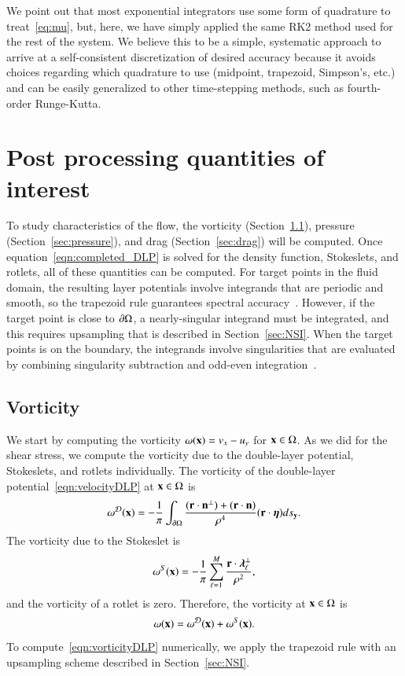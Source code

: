 \documentclass[preprint, 10pt]{elsarticle}
\begin{document}
We point out that most exponential integrators use some form of quadrature to treat~\eqref{eq:mu}, but, here, we have simply applied the same RK2 method used for the rest of the system. We believe this to be a simple, systematic approach to arrive at a self-consistent discretization of desired accuracy because it avoids choices regarding which quadrature to use (midpoint, trapezoid, Simpson's, etc.) and can be easily generalized to other time-stepping methods, such as fourth-order Runge-Kutta. 


\section{Post processing quantities of interest}
\label{s:qoi}
To study characteristics of the flow, the vorticity
(Section~\ref{sec:vorticity}), pressure (Section~\ref{sec:pressure}),
and drag (Section~\ref{sec:drag}) will be computed.  Once
equation~\eqref{eqn:completed_DLP} is solved for the density function,
Stokeslets, and rotlets, all of these quantities can be computed.  For
target points in the fluid domain, the resulting layer potentials
involve integrands that are periodic and smooth, so the trapezoid rule
guarantees spectral accuracy~\cite{tre-wei2014}.  However, if the target
point is close to ${\partial} \Omega$, a nearly-singular integrand must be
integrated, and this requires upsampling that is described in
Section~\ref{sec:NSI}.  When the target points is on the boundary, the
integrands involve singularities that are evaluated by combining
singularity subtraction and odd-even integration~\cite{sid-isr1988}.  



\subsection{Vorticity}
\label{sec:vorticity}
We start by computing the vorticity $\omega({\mathbf{x}}) = v_x - u_y$ for ${\mathbf{x}} \in
\Omega$.  As we did for the shear stress, we compute the vorticity due
to the double-layer potential, Stokeslets, and rotlets individually.
The vorticity of the double-layer potential~\eqref{eqn:velocityDLP} at
${\mathbf{x}} \in \Omega$ is
\begin{align}
  \omega^{{\mathcal{D}}}({\mathbf{x}}) = -\frac{1}{\pi}\int_{{\partial}\Omega} 
    \frac{({\mathbf{r}} \cdot {\mathbf{n}}^\perp) + ({\mathbf{r}} \cdot {\mathbf{n}})}{\rho^4}
    ({\mathbf{r}} \cdot {\boldsymbol\eta}) ds_{{\mathbf{y}}}.
  \label{eqn:vorticityDLP}
\end{align}
The vorticity due to the Stokeslet is
\begin{align*}
  \omega^S({\mathbf{x}}) = -\frac{1}{\pi} \sum_{\ell=1}^{M} 
    \frac{{\mathbf{r}} \cdot {\boldsymbol\lambda}_\ell^\perp}{\rho^2},
\end{align*}
and the vorticity of a rotlet is zero.  Therefore, the vorticity at ${\mathbf{x}}
\in \Omega$ is
\begin{align*}
  \omega({\mathbf{x}}) = \omega^{\mathcal{D}}({\mathbf{x}}) + \omega^S({\mathbf{x}}).
\end{align*}
To compute~\eqref{eqn:vorticityDLP} numerically, we apply the trapezoid
rule with an upsampling scheme described in Section~\ref{sec:NSI}.
\end{document}
